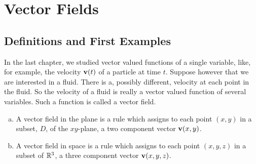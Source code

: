 
\graphicspath{{figures/vector_fields/}}
\chapter{Vector Fields}\label{chap vector fields}

\section{Definitions and First Examples}\label{sec:vfDefs}

In the last chapter, we studied vector valued functions of a single variable,
like, for example, the velocity $\mathbf{v}(t)$ of a particle at time $t$.
Suppose however that we are interested in a fluid. 
There is a, possibly different, velocity at each point in the fluid. 
So the velocity of a fluid is really a vector valued function
of several variables. Such a function is called a vector field.

\begin{defn}\label{def:vectorField}
\begin{enumerate}[(a)]
\item 
A vector field in the plane is a rule which assigns to each point $(x,y)$
in a subset, $D$, of the $xy$-plane, a two component vector $\mathbf{v}(x,y)$.
\item
A vector field in space is a rule which assigns to each point $(x,y,z)$
in a subset of $\mathbb{R}^3$, a three component vector $\mathbf{v}(x,y,z)$.
\end{enumerate}
\end{defn}


%



